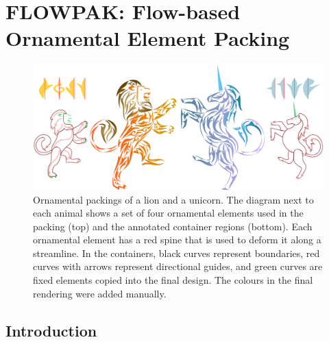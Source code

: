 \chapter
{FLOWPAK: Flow-based Ornamental Element Packing}
\label{chapter_flowpak}



\begin{figure}[h!]
\centering
\includegraphics[width=1.0\textwidth]{figures/flowpak/lion_unicorn.pdf} 
\caption[A packing of lion and unicorn]
{\label{fig_lion_unicorn} 
Ornamental packings of a lion and a unicorn.
The diagram next to each animal shows a set of four ornamental
elements used in the packing (top) and the annotated
container regions (bottom).  Each ornamental element has a
red spine that is used to deform it along a streamline.  In
the containers, black curves represent boundaries, red
curves with arrows represent directional guides, and green
curves are fixed elements copied into the final design.
The colours in the final rendering were added manually. }
\end{figure}




\section{Introduction}
\label{flowpak_introduction}


